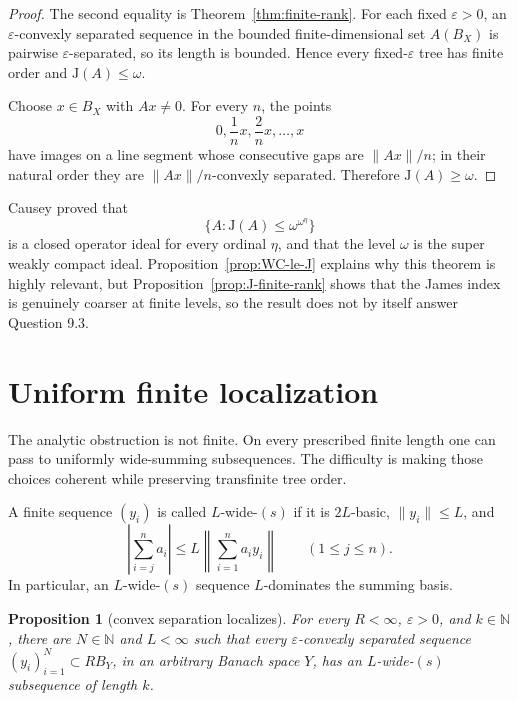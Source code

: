 \documentclass[11pt]{article}
\newtheorem{proposition}[theorem]{Proposition}
\theoremstyle{definition}
\theoremstyle{remark}
\newcommand{\J}{\mathrm{J}}
\newcommand{\eps}{\varepsilon}
\newcommand{\N}{\mathbb N}
\begin{document}
\begin{proof}
The second equality is Theorem~\ref{thm:finite-rank}.  For each fixed $\eps>0$, an $\eps$-convexly separated sequence in the bounded finite-dimensional set $A(B_X)$ is pairwise $\eps$-separated, so its length is bounded.  Hence every fixed-$\eps$ tree has finite order and $\J(A)\leq\omega$.

Choose $x\in B_X$ with $Ax\neq0$.  For every $n$, the points
\[
   0,\frac1n x,\frac2n x,\dots,x
\]
have images on a line segment whose consecutive gaps are $\|Ax\|/n$; in their natural order they are $\|Ax\|/n$-convexly separated.  Therefore $\J(A)\geq\omega$.
\end{proof}

Causey proved that
\[
   \{A:\J(A)\leq\omega^{\omega^\eta}\}
\]
is a closed operator ideal for every ordinal $\eta$, and that the level $\omega$ is the super weakly compact ideal.  Proposition~\ref{prop:WC-le-J} explains why this theorem is highly relevant, but Proposition~\ref{prop:J-finite-rank} shows that the James index is genuinely coarser at finite levels, so the result does not by itself answer Question 9.3.

\section{Uniform finite localization}

The analytic obstruction is not finite.  On every prescribed finite length one can pass to uniformly wide-summing subsequences.  The difficulty is making those choices coherent while preserving transfinite tree order.

A finite sequence $(y_i)$ is called $L$-wide-$(s)$ if it is $2L$-basic, $\|y_i\|\leq L$, and
\[
   \left|\sum_{i=j}^n a_i\right|
   \leq L\left\|\sum_{i=1}^n a_i y_i\right\|
   \qquad(1\leq j\leq n).
\]
In particular, an $L$-wide-$(s)$ sequence $L$-dominates the summing basis.

\begin{proposition}[convex separation localizes]\label{prop:cs-localization}
For every $R<\infty$, $\eps>0$, and $k\in\N$, there are $N\in\N$ and $L<\infty$ such that every $\eps$-convexly separated sequence $(y_i)_{i=1}^N\subset R B_Y$, in an arbitrary Banach space $Y$, has an $L$-wide-$(s)$ subsequence of length $k$.
\end{proposition}
\end{document}
